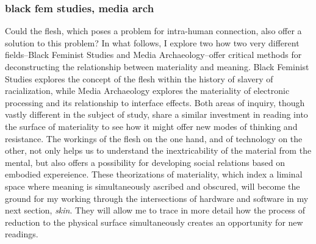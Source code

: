 \documentclass[11pt]{article}
\begin{document}
\subsubsection{black fem studies, media arch}
\label{sec:orgdd4d1f7}
Could the flesh, which poses a problem for intra-human connection,
also offer a solution to this problem? In what follows, I explore two
how two very different fields--Black Feminist Studies and Media
Archaeology--offer critical methods for deconstructing the
relationship between materiality and meaning. Black Feminist Studies
explores the concept of the flesh within the history of slavery of
racialization, while Media Archaeology explores the materiality of
electronic processing and its relationship to interface effects. Both
areas of inquiry, though vastly different in the subject of study,
share a similar investment in reading into the surface of materiality
to see how it might offer new modes of thinking and resistance. The
workings of the flesh on the one hand, and of technology on the other,
not only helps us to understand the inextricability of the material
from the mental, but also offers a possibility for developing social
relations based on embodied expereience. These theorizations of
materiality, which index a liminal space where meaning is
simultaneously ascribed and obscured, will become the ground for my
working through the intersections of hardware and software in my next
section, \emph{skin}. They will allow me to trace in more detail how the
process of reduction to the physical surface simultaneously creates an
opportunity for new readings.
\end{document}
